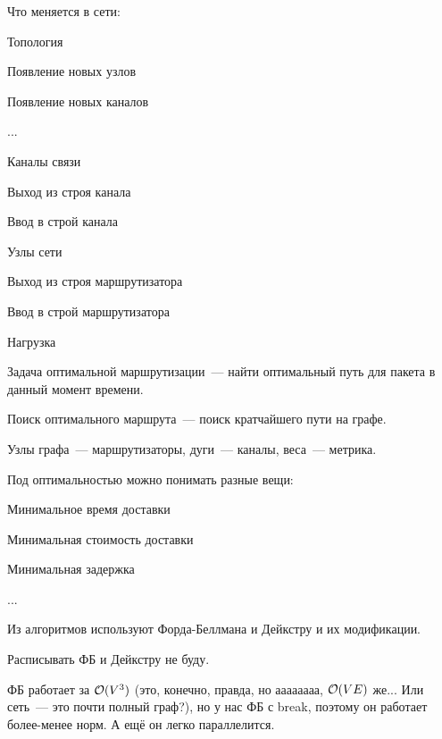 Что меняется в сети:
\begin{MyItemize}
    \item Топология
    \begin{MyItemize}
        \item Появление новых узлов
        \item Появление новых каналов
        \item ...
    \end{MyItemize}
    \item Каналы связи
    \begin{MyItemize}
        \item Выход из строя канала
        \item Ввод в строй канала
    \end{MyItemize}
    \item Узлы сети
    \begin{MyItemize}
        \item Выход из строя маршрутизатора
        \item Ввод в строй маршрутизатора
    \end{MyItemize}
    \item Нагрузка
\end{MyItemize}


Задача оптимальной маршрутизации~--- найти оптимальный путь для пакета в данный момент времени.

Поиск оптимального маршрута~--- поиск кратчайшего пути на графе.

Узлы графа~--- маршрутизаторы, дуги~--- каналы, веса~--- метрика.

Под оптимальностью можно понимать разные вещи:
\begin{MyItemize}
    \item Минимальное время доставки
    \item Минимальная стоимость доставки
    \item Минимальная задержка
    \item ...
\end{MyItemize}

Из алгоритмов используют Форда-Беллмана и Дейкстру и их модификации.

Расписывать ФБ и Дейкстру не буду.

ФБ работает за $\mathcal{O}(V^3)$ (это, конечно, правда, но аааааааа, $\mathcal{O}(VE)$ же... Или сеть~--- это почти полный граф?), но у нас ФБ с break, поэтому он работает более-менее норм. А ещё он легко параллелится.

